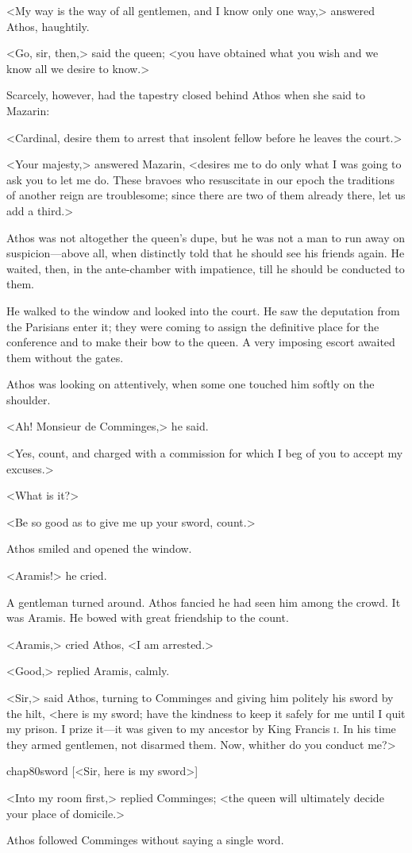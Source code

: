 <My way is the way of all gentlemen, and I know only one way,> answered Athos, haughtily.

<Go, sir, then,> said the queen; <you have obtained what you wish and we know all we desire to know.>

Scarcely, however, had the tapestry closed behind Athos when she said to Mazarin:

<Cardinal, desire them to arrest that insolent fellow before he leaves the court.>

<Your majesty,> answered Mazarin, <desires me to do only what I was going to ask you to let me do. These bravoes who resuscitate in our epoch the traditions of another reign are troublesome; since there are two of them already there, let us add a third.>

Athos was not altogether the queen's dupe, but he was not a man to run away on suspicion—above all, when distinctly told that he should see his friends again. He waited, then, in the ante-chamber with impatience, till he should be conducted to them.

He walked to the window and looked into the court. He saw the deputation from the Parisians enter it; they were coming to assign the definitive place for the conference and to make their bow to the queen. A very imposing escort awaited them without the gates.

Athos was looking on attentively, when some one touched him softly on the shoulder.

<Ah! Monsieur de Comminges,> he said.

<Yes, count, and charged with a commission for which I beg of you to accept my excuses.>

<What is it?>

<Be so good as to give me up your sword, count.>

Athos smiled and opened the window.

<Aramis!> he cried.

A gentleman turned around. Athos fancied he had seen him among the crowd. It was Aramis. He bowed with great friendship to the count.

<Aramis,> cried Athos, <I am arrested.>

<Good,> replied Aramis, calmly.

<Sir,> said Athos, turning to Comminges and giving him politely his sword by the hilt, <here is my sword; have the kindness to keep it safely for me until I quit my prison. I prize it—it was given to my ancestor by King Francis \textsc{i}. In his time they armed gentlemen, not disarmed them. Now, whither do you conduct me?>

\begin{bwbigpic}
	[\basicscale] 
	{chap80sword}
	[<Sir, here is my sword>]
\end{bwbigpic}

<Into my room first,> replied Comminges; <the queen will ultimately decide your place of domicile.>

Athos followed Comminges without saying a single word. 